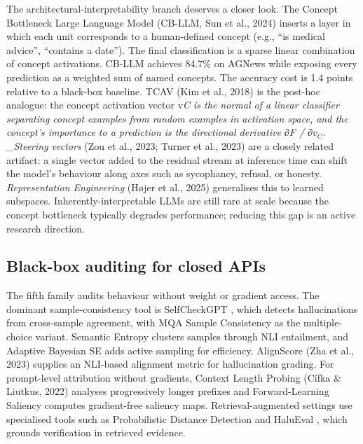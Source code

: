 \documentclass{article}
\begin{document}
The architectural-interpretability branch deserves a closer look. The Concept Bottleneck Large Language Model (CB-LLM, Sun et al., 2024) inserts a layer in which each unit corresponds to a human-defined concept (e.g., ``is medical advice'', ``contains a date''). The final classification is a sparse linear combination of concept activations. CB-LLM achieves 84.7\% on AGNews while exposing every prediction as a weighted sum of named concepts. The accuracy cost is 1.4 points relative to a black-box baseline. TCAV (Kim et al., 2018) is the post-hoc analogue: the concept activation vector v\emph{C is the normal of a linear classifier separating concept examples from random examples in activation space, and the concept's importance to a prediction is the directional derivative ∂F / ∂\(v_C\). \_Steering vectors} (Zou et al., 2023; Turner et al., 2023) are a closely related artifact: a single vector added to the residual stream at inference time can shift the model's behaviour along axes such as sycophancy, refusal, or honesty. \emph{Representation Engineering} (Højer et al., 2025) generalises this to learned subspaces. Inherently-interpretable LLMs are still rare at scale because the concept bottleneck typically degrades performance; reducing this gap is an active research direction.

\subsection{Black-box auditing for closed APIs}\label{black-box-auditing-for-closed-apis}

The fifth family audits behaviour without weight or gradient access. The dominant sample-consistency tool is SelfCheckGPT \citep{manakul2023selfcheckgptzerore}, which detects hallucinations from cross-sample agreement, with MQA Sample Consistency \citep{manakul2023selfcheckgptzerore} as the multiple-choice variant. Semantic Entropy \citep{farquhar2024detectinghallucina} clusters samples through NLI entailment, and Adaptive Bayesian SE \citep{sun2026efficienthallucina} adds active sampling for efficiency. AlignScore (Zha et al., 2023) supplies an NLI-based alignment metric for hallucination grading. For prompt-level attribution without gradients, Context Length Probing (Cífka \& Liutkus, 2022) analyses progressively longer prefixes and Forward-Learning Saliency \citep{zhang2024acomprehensivestud} computes gradient-free saliency maps. Retrieval-augmented settings use specialised tools such as Probabilistic Distance Detection \citep{oblovatny2025probabilisticdista} and HaluEval \citep{li2024pmetprecisemodeled}, which grounds verification in retrieved evidence.
\end{document}
